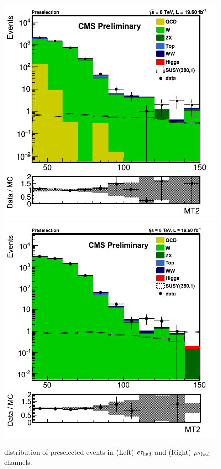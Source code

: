 \begin{figure}[!Hhtb]
\centering
\includegraphics[angle=0,scale=0.35]{SelectionEleTau/MT2.png}
\includegraphics[angle=0,scale=0.35]{SelectionMuTau/MT2_Ratio_Preselection_unBlinded.png}
\caption{\mttwo distribution of preselected events in (Left) $e\tau_{\rm had}$ and (Right) $\mu\tau_{\rm had}$ channels.}
\label{fig:mt2leptontau}
\end{figure}

